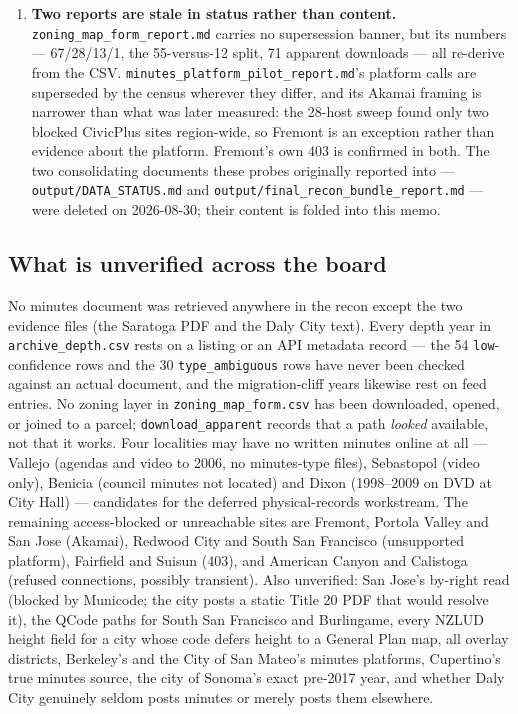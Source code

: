 \documentclass[11pt]{article}
\begin{document}
\begin{enumerate}
\item \textbf{Two reports are stale in status rather than content.}
\texttt{zoning\_map\_form\_report.md} carries no supersession banner, but its numbers ---
67/28/13/1, the 55-versus-12 split, 71 apparent downloads --- all re-derive from the CSV.
\texttt{minutes\_platform\_pilot\_report.md}'s platform calls are superseded by the census
wherever they differ, and its Akamai framing is narrower than what was later measured: the
28-host sweep found only two blocked CivicPlus sites region-wide, so Fremont is an exception
rather than evidence about the platform. Fremont's own 403 is confirmed in both. The two
consolidating documents these probes originally reported into ---
\texttt{output/DATA\_STATUS.md} and \texttt{output/final\_recon\_bundle\_report.md} --- were
deleted on 2026-08-30; their content is folded into this memo.

\end{enumerate}

\subsection{What is unverified across the board}

No minutes document was retrieved anywhere in the recon except the two evidence files (the
Saratoga PDF and the Daly City text). Every depth year in \texttt{archive\_depth.csv} rests on a
listing or an API metadata record --- the 54 \texttt{low}-confidence rows and the 30
\texttt{type\_ambiguous} rows have never been checked against an actual document, and the
migration-cliff years likewise rest on feed entries. No zoning layer in
\texttt{zoning\_map\_form.csv} has been downloaded, opened, or joined to a parcel;
\texttt{download\_apparent} records that a path \emph{looked} available, not that it works. Four
localities may have no written minutes online at all --- Vallejo (agendas and video to 2006, no
minutes-type files), Sebastopol (video only), Benicia (council minutes not located) and Dixon
(1998--2009 on DVD at City Hall) --- candidates for the deferred physical-records workstream. The
remaining access-blocked or unreachable sites are Fremont, Portola Valley and San Jose (Akamai),
Redwood City and South San Francisco (unsupported platform), Fairfield and Suisun (403), and
American Canyon and Calistoga (refused connections, possibly transient). Also unverified: San
Jose's by-right read (blocked by Municode; the city posts a static Title 20 PDF that would
resolve it), the QCode paths for South San Francisco and Burlingame, every NZLUD height field for
a city whose code defers height to a General Plan map, all overlay districts, Berkeley's and the
City of San Mateo's minutes platforms, Cupertino's true minutes source, the city of Sonoma's
exact pre-2017 year, and whether Daly City genuinely seldom posts minutes or merely posts them
elsewhere.
\end{document}
